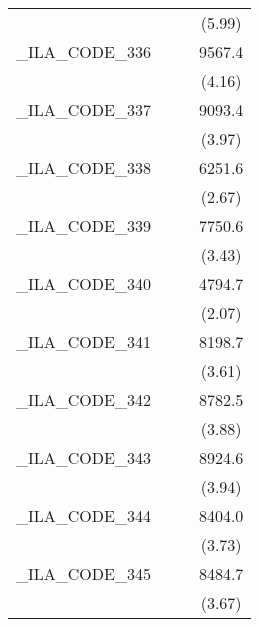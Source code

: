 {\begin{tabular}{l*{3}{c}}
            &                     &                     &      (5.99)         \\
[1em]
\_ILA\_CODE\_336&                     &                     &      9567.4\sym{***}\\
            &                     &                     &      (4.16)         \\
[1em]
\_ILA\_CODE\_337&                     &                     &      9093.4\sym{***}\\
            &                     &                     &      (3.97)         \\
[1em]
\_ILA\_CODE\_338&                     &                     &      6251.6\sym{**} \\
            &                     &                     &      (2.67)         \\
[1em]
\_ILA\_CODE\_339&                     &                     &      7750.6\sym{***}\\
            &                     &                     &      (3.43)         \\
[1em]
\_ILA\_CODE\_340&                     &                     &      4794.7\sym{*}  \\
            &                     &                     &      (2.07)         \\
[1em]
\_ILA\_CODE\_341&                     &                     &      8198.7\sym{***}\\
            &                     &                     &      (3.61)         \\
[1em]
\_ILA\_CODE\_342&                     &                     &      8782.5\sym{***}\\
            &                     &                     &      (3.88)         \\
[1em]
\_ILA\_CODE\_343&                     &                     &      8924.6\sym{***}\\
            &                     &                     &      (3.94)         \\
[1em]
\_ILA\_CODE\_344&                     &                     &      8404.0\sym{***}\\
            &                     &                     &      (3.73)         \\
[1em]
\_ILA\_CODE\_345&                     &                     &      8484.7\sym{***}\\
            &                     &                     &      (3.67)         \\

\end{tabular}}
